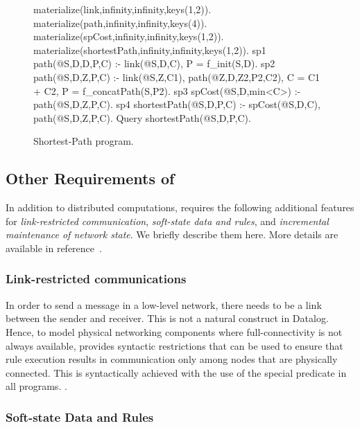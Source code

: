 

\begin{figure}[t]
\begin{NDlog}
materialize(link,infinity,infinity,keys(1,2)). 
materialize(path,infinity,infinity,keys(4)). 
materialize(spCost,infinity,infinity,keys(1,2)). 
materialize(shortestPath,infinity,infinity,keys(1,2)). 
sp1 path(@S,D,D,P,C) :- link(@S,D,C), P = f_init(S,D).
sp2 path(@S,D,Z,P,C) :- link(@S,Z,C1), path(@Z,D,Z2,P2,C2), C = C1 + C2,
                        P = f_concatPath(S,P2). 
sp3 spCost(@S,D,min<C>) :- path(@S,D,Z,P,C).
sp4 shortestPath(@S,D,P,C) :- spCost(@S,D,C), path(@S,D,Z,P,C).
Query shortestPath(@S,D,P,C).
\end{NDlog}
\caption{{\small Shortest-Path \Lang program.}}\label{fig:language:shortestPath}
\end{figure}


\subsection{Other Requirements of \Lang}

In addition to distributed computations, \Lang requires the following
additional features for {\em link-restricted communication}, {\em
  soft-state data and rules}, and {\em incremental maintenance of
  network state}. We briefly describe them here. More details are
available in reference~\cite{boonThesis}.


\subsubsection{Link-restricted communications} 

In order to send a message in a low-level network, there needs to be a
link between the sender and receiver. This is not a natural construct in
Datalog. Hence, to model physical networking components where
full-connectivity is not always available, \Lang provides syntactic
restrictions that can be used to ensure that rule execution results in
communication only among nodes that are physically connected. This is
syntactically achieved with the use of the special \nd{link\xspace}
predicate in all \Lang programs. .
 
\subsubsection{Soft-state Data and Rules}

